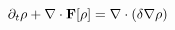 \begin{displaymath}
\partial_t \rho + \nabla\cdot {\bf F}[\rho] = \nabla \cdot (\delta \nabla \rho)
\end{displaymath}
